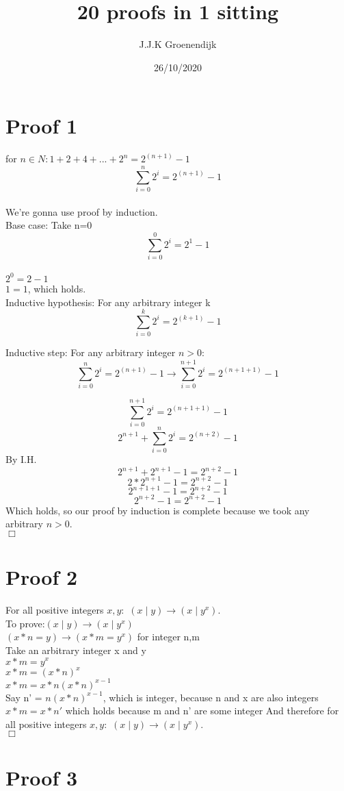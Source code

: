 \documentclass{article}
\title{20 proofs in 1 sitting}
\author{J.J.K Groenendijk}
\date{26/10/2020}
\begin{document}
\section{Proof 1}
for $n \in N: 1+2+4+...+2^n = 2^{(n+1)}-1$\\
$$\sum_{i=0}^{n}2^i = 2^{(n+1)}-1$$\\

We're gonna use proof by induction.\\
Base case: Take n=0 $$ \sum_{i=0}^{0}2^i = 2^1-1$$\\
$ 2^0 = 2-1$\\
$1 = 1$, which holds.\\

Inductive hypothesis: For any arbitrary integer k $$\sum_{i=0}^{k}2^i = 2^{(k+1)}-1$$ 

Inductive step: For any arbitrary integer $n > 0$: $$\sum_{i=0}^{n}2^i = 2^{(n+1)}-1 \rightarrow \sum_{i=0}^{n+1}2^i = 2^{(n+1+1)}-1 $$

$$\sum_{i=0}^{n+1}2^i = 2^{(n+1+1)}-1$$
$$2^{n+1} + \sum_{i=0}^{n}2^i = 2^{(n+2)}-1$$
By I.H.
$$2^{n+1} + 2^{n+1}-1 = 2^{n+2}-1$$
$$2 * 2^{n+1} -1 = 2^{n+2}-1$$
$$2^{n+1+1} -1 = 2^{n+2}-1$$
$$2^{n+2} -1 = 2^{n+2}-1$$ 
Which holds, so our proof by induction is complete because we took any arbitrary $n > 0$.\\
$\Box$



\section{Proof 2}
For all positive integers $x, y:$  $ (x\mid y) \rightarrow (x \mid y^x)$.\\
To prove:$ (x\mid y) \rightarrow (x \mid y^x)$\\
$ (x*n= y) \rightarrow (x*m = y^x)$ for integer n,m\\
Take an arbitrary integer x and y\\
$x*m = y^x$\\
$x*m = (x*n)^x$\\
$x*m = x*n(x*n)^{x-1}$\\
Say n' = $n(x*n)^{x-1}$, which is integer, because n and x are also integers\\
$x*m = x*n'$ which holds because m and n' are some integer
And therefore for all positive integers $x, y:$  $ (x\mid y) \rightarrow (x \mid y^x)$.\\
$\Box$

\section{Proof 3}
\end{document}

